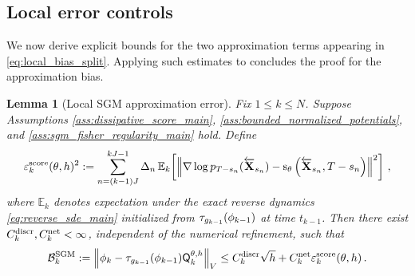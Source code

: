 \documentclass[11pt]{article}
\theoremstyle{plain}
\newtheorem{lemma}[theorem]{Lemma}
\theoremstyle{definition}
\theoremstyle{remark}
\begin{document}
\subsection{Local error controls}

We now derive explicit bounds for the two approximation terms appearing in \eqref{eq:local_bias_split}. Applying such estimates to  concludes the proof for the approximation bias.


\begin{lemma}[Local SGM approximation error]
\label{lem:block_sgm_bias}
Fix $1\le k\le N$. Suppose Assumptions \ref{ass:dissipative_score_main},
\ref{ass:bounded_normalized_potentials}, and \ref{ass:sgm_fisher_regularity_main} hold. Define
$$
\varepsilon_k^{\rm score}(\theta,h)^2 \eqdef \sum_{n=(k-1)J}^{kJ-1} \Delta_n\, \mathbb E_k \!\left[ \left\| \nabla\log p_{T-s_n}(\Xola_{s_n}) - \scorenet[T-s_n][\Xola_{s_n}][\theta] \right\|^2 \right] \eqsp,
$$
where $\mathbb E_k$ denotes expectation under the exact reverse dynamics \eqref{eq:reverse_sde_main} initialized from $\tau_{\pot{k-1}}(\filter{k-1})$ at time $t_{k-1}$.
Then there exist $C_k^{\rm discr},C_k^{\rm net}<\infty$, independent of the numerical refinement, such that
$$
\mathcal B_k^{\rm SGM} \eqdef \vnorm[ \filter{k} - \tau_{\pot{k-1}}(\filter{k-1})\mk{k}[\theta,h] ][V] \le C_k^{\rm discr}\sqrt h + C_k^{\rm net}\varepsilon_k^{\rm score}(\theta,h) \eqsp.
$$
\end{lemma}
\end{document}
